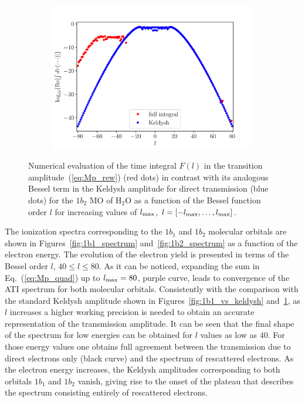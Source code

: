 \begin{figure}
\begin{subfigure}[b]{0.33\linewidth}
    \includegraphics[width=\textwidth]{figures/ch_ATI_SFA/1b2/l80n512WP50PG25MR35vsKeldysh.pdf}
  \end{subfigure}
  \caption{Numerical evaluation of the time integral $F(l)$ in the
    transition amplitude~(\ref{eq:Mp_rew}) (red dots) in contrast with
    its analogous Bessel term in the Keldysh amplitude for direct
    transmission (blue dots) for the $1b_{2}$ MO of H$_{2}$O as a
    function of the Bessel function order $l$ for increasing values of
    $l_{\rm{max}}$, $l=[ -l_{\rm{max}} , \dots, l_{\rm{max}}]$.}
    \label{fig:1b2_vs_keldysh}
\end{figure}

The ionization spectra corresponding to the $1b_{1}$ and $1b_{2}$
molecular orbitals are shown in Figures~\ref{fig:1b1_spectrum}
and~\ref{fig:1b2_spectrum} as a function of the electron energy. The
evolution of the electron yield is presented in terms of the Bessel
order $l$, $40 \leq l \leq 80$. As it can be noticed, expanding the
sum in Eq.~(\ref{eq:Mp_quad}) up to $l_{\rm{max}} = 80$, purple curve,
leads to convergence of the ATI spectrum for both molecular
orbitals. Consistently with the comparison with the standard Keldysh
amplitude shown in Figures~\ref{fig:1b1_vs_keldysh}
and~\ref{fig:1b2_vs_keldysh}, as $l$ increases a higher working
precision is needed to obtain an accurate representation of the
transmission amplitude. It can be seen that the final shape of the
spectrum for low energies can be obtained for $l$ values as low as
$40$. For those energy values one obtains full agreement between the
transmission due to direct electrons only (black curve) and the
spectrum of rescattered electrons. As the electron energy increases,
the Keldysh amplitudes corresponding to both orbitals $1b_{1}$ and
$1b_{2}$ vanish, giving rise to the onset of the plateau that
describes the spectrum consisting entirely of rescattered electrons.


